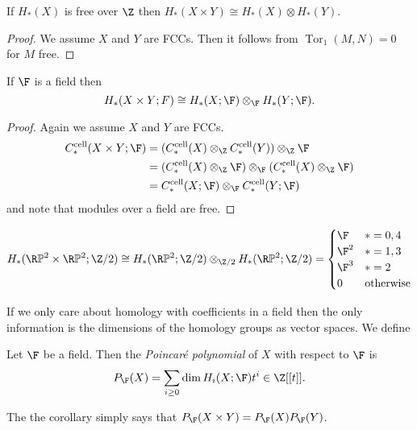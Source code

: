 \documentclass[a4paper]{article}
\renewcommand*{\P}{\mathbb{P}}
\newcommand{\cell}{\mathrm{cell}}
\DeclareMathOperator{\Tor}{Tor} %
\begin{document}
\begin{corollary}
  If \(H_*(X)\) is free over \(\Z\) then \(H_*(X \times Y) \cong H_*(X) \otimes H_*(Y)\).
\end{corollary}

\begin{proof}
  We assume \(X\) and \(Y\) are FCCs. Then it follows from \(\Tor_1(M, N) = 0\) for \(M\) free.
\end{proof}

\begin{corollary}
  If \(\F\) is a field then
  \[
    H_*(X \times Y; F) \cong H_*(X; \F) \otimes_\F H_*(Y; \F).
  \]
\end{corollary}

\begin{proof}
  Again we assume \(X\) and \(Y\) are FCCs.
  \begin{align*}
    C_*^\cell(X \times Y; \F)
    &= (C_*^\cell(X) \otimes_\Z C_*^\cell(Y)) \otimes_\Z \F \\
    &= (C_*^\cell(X) \otimes_\Z \F) \otimes_\F (C_*^\cell(X) \otimes_\Z \F) \\
    &= C_*^\cell(X; \F) \otimes_\F C_*^\cell(Y; \F)
  \end{align*}
  and note that modules over a field are free.
\end{proof}

\begin{eg}
  \[
    H_*(\R\P^2 \times \R\P^2; \Z/2)
    \cong H_*(\R\P^2; \Z/2) \otimes_{\Z/2} H_*(\R\P^2; \Z/2)
    =
    \begin{cases}
      \F & * = 0, 4 \\
      \F^2 & * = 1, 3 \\
      \F^3 & * = 2 \\
      0 & \text{otherwise}
    \end{cases}
  \]
\end{eg}

If we only care about homology with coefficients in a field then the only information is the dimensions of the homology groups as vector spaces. We define

\begin{definition}
  Let \(\F\) be a field. Then the \emph{Poincaré polynomial} of \(X\) with respect to \(\F\) is
  \[
    P_\F(X) = \sum_{i \geq 0} \dim H_i(X; \F) t^i \in \Z[[t]].
  \]
\end{definition}

The the corollary simply says that \(P_\F(X \times Y) = P_\F(X) P_\F(Y)\).
\end{document}

